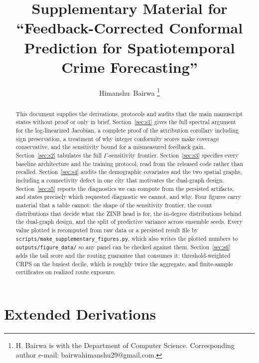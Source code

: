 \documentclass[journal,10pt,onecolumn]{IEEEtran}
\begin{document}
\title{Supplementary Material for\\
``Feedback-Corrected Conformal Prediction for Spatiotemporal Crime
Forecasting''}

\author{Himanshu~Bairwa%
\thanks{H. Bairwa is with the Department of Computer Science. Corresponding
author e-mail: bairwahimanshu29@gmail.com.}%
}

\maketitle

\begin{abstract}
This document supplies the derivations, protocols and audits that the main
manuscript states without proof or only in brief. Section~\ref{sec:s1} gives the
full spectral argument for the log-linearized Jacobian, a complete proof of the
attribution corollary including sign preservation, a treatment of why integer
conformity scores make coverage conservative, and the sensitivity bound for a
mismeasured feedback gain. Section~\ref{sec:s2} tabulates the full
$\Gamma$-sensitivity frontier. Section~\ref{sec:s3} specifies every baseline
architecture and the training protocol, read from the released code rather than
recalled. Section~\ref{sec:s4} audits the demographic covariates and the two
spatial graphs, including a connectivity defect in one city that motivates the
dual-graph design. Section~\ref{sec:s5} reports the diagnostics we can compute
from the persisted artifacts, and states precisely which requested diagnostic we
cannot, and why. Four figures carry material that a table cannot: the shape of the
sensitivity frontier, the count distributions that decide what the ZINB head is
for, the in-degree distributions behind the dual-graph design, and the split of
predictive variance across ensemble seeds. Every value plotted is recomputed from
raw data or a persisted result file by
\texttt{scripts/make\_supplementary\_figures.py}, which also writes the plotted
numbers to \texttt{outputs/figure\_data/} so any panel can be checked against them.
Section~\ref{sec:s6} adds the tail score and the routing guarantee that consumes
it: threshold-weighted CRPS on the busiest decile, which is roughly twice the
aggregate, and finite-sample certificates on realized route exposure.
\end{abstract}

\section{Extended Derivations}
\label{sec:s1}
\end{document}
